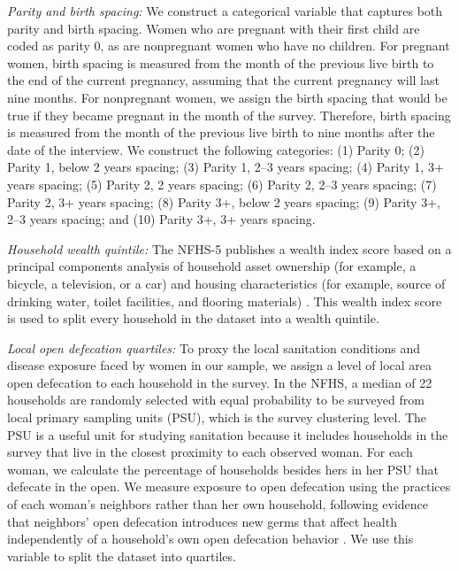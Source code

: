 \documentclass[12pt]{article}
\begin{document}
\textit{Parity and birth spacing:}
We construct a categorical variable that captures both parity and birth spacing. Women who are pregnant with their first child are coded as parity 0, as are nonpregnant women who have no children.  For pregnant women, birth spacing is measured from the month of the previous live birth to the end of the current pregnancy, assuming that the current pregnancy will last nine months. For nonpregnant women, we assign the birth spacing that would be true if they became pregnant in the month of the survey.  Therefore, birth spacing is measured from the month of the previous live birth to nine months after the date of the interview. 
We construct the following categories: (1) Parity 0; (2) Parity 1, below 2 years spacing; (3) Parity 1, 2–3 years spacing; (4) Parity 1, 3+ years spacing; (5) Parity 2, 2 years spacing; (6) Parity 2, 2–3 years spacing; (7) Parity 2, 3+ years spacing; (8) Parity 3+, below 2 years spacing; (9) Parity 3+, 2–3 years spacing; and (10) Parity 3+, 3+ years spacing.

\textit{Household wealth quintile:}
The NFHS-5 publishes a wealth index score based on a principal components analysis of household asset ownership (for example, a bicycle, a television, or a car) and housing characteristics (for example, source of drinking water, toilet facilities, and flooring materials) \citep{iips_icf_nfhs5_2022}. This wealth index score is used to split every household in the dataset into a wealth quintile. 

\textit{Local open defecation quartiles:}
To proxy the local sanitation conditions and disease exposure faced by women in our sample, we assign a level of local area open defecation to each household in the survey. In the NFHS, a median of 22 households are randomly selected with equal probability to be surveyed from local primary sampling units (PSU), which is the survey clustering level. The PSU is a useful unit for studying sanitation because it includes households in the survey that live in the closest proximity to each observed woman. For each woman, we calculate the percentage of households besides hers in her PSU that defecate in the open. We measure exposure to open defecation using the practices of each woman’s neighbors rather than her own household, following evidence that neighbors’ open defecation introduces new germs that affect health independently of a household’s own open defecation behavior \citep{geruso2018neighborhood}.  We use this variable to split the dataset into quartiles. 
\end{document}
